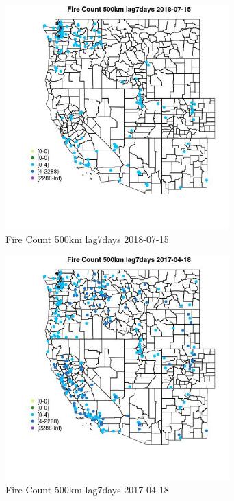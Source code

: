 \begin{figure} 
\centering  
\includegraphics[width=0.77\textwidth]{Code_Outputs/Report_ML_input_PM25_Step4_part_e_de_duplicated_aves_compiled_2019-05-21wNAs_MapObsFire_Count_500km_lag7days2018-07-15.jpg} 
\caption{\label{fig:Report_ML_input_PM25_Step4_part_e_de_duplicated_aves_compiled_2019-05-21wNAsMapObsFire_Count_500km_lag7days2018-07-15}Fire Count 500km lag7days 2018-07-15} 
\end{figure} 
 

\begin{figure} 
\centering  
\includegraphics[width=0.77\textwidth]{Code_Outputs/Report_ML_input_PM25_Step4_part_e_de_duplicated_aves_compiled_2019-05-21wNAs_MapObsFire_Count_500km_lag7days2017-04-18.jpg} 
\caption{\label{fig:Report_ML_input_PM25_Step4_part_e_de_duplicated_aves_compiled_2019-05-21wNAsMapObsFire_Count_500km_lag7days2017-04-18}Fire Count 500km lag7days 2017-04-18} 
\end{figure} 
 

